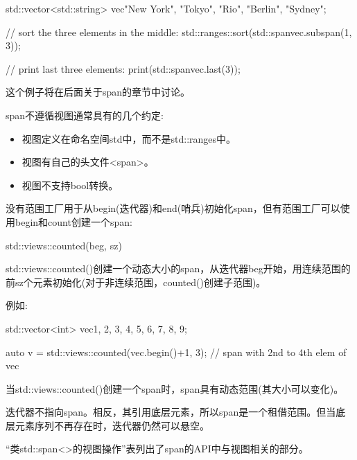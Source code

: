 \begin{cpp}
std::vector<std::string> vec{"New York", "Tokyo", "Rio", "Berlin", "Sydney"};

// sort the three elements in the middle:
std::ranges::sort(std::span{vec}.subspan(1, 3));

// print last three elements:
print(std::span{vec}.last(3));
\end{cpp}

这个例子将在后面关于span的章节中讨论。

span不遵循视图通常具有的几个约定:

\begin{itemize}
\item
视图定义在命名空间std中，而不是std::ranges中。

\item
视图有自己的头文件<span>。

\item
视图不支持bool转换。
\end{itemize}


没有范围工厂用于从begin(迭代器)和end(哨兵)初始化span，但有范围工厂可以使用begin和count创建一个span:

\begin{cpp}
std::views::counted(beg, sz)
\end{cpp}

std::views::counted()创建一个动态大小的span，从迭代器beg开始，用连续范围的前sz个元素初始化(对于非连续范围，counted()创建子范围)。

例如:

\begin{cpp}
std::vector<int> vec{1, 2, 3, 4, 5, 6, 7, 8, 9};

auto v = std::views::counted(vec.begin()+1, 3); // span with 2nd to 4th elem of vec
\end{cpp}

当std::views::counted()创建一个span时，span具有动态范围(其大小可以变化)。


迭代器不指向span。相反，其引用底层元素，所以span是一个租借范围。但当底层元素序列不再存在时，迭代器仍然可以悬空。


“类std::span<>的视图操作”表列出了span的API中与视图相关的部分。


